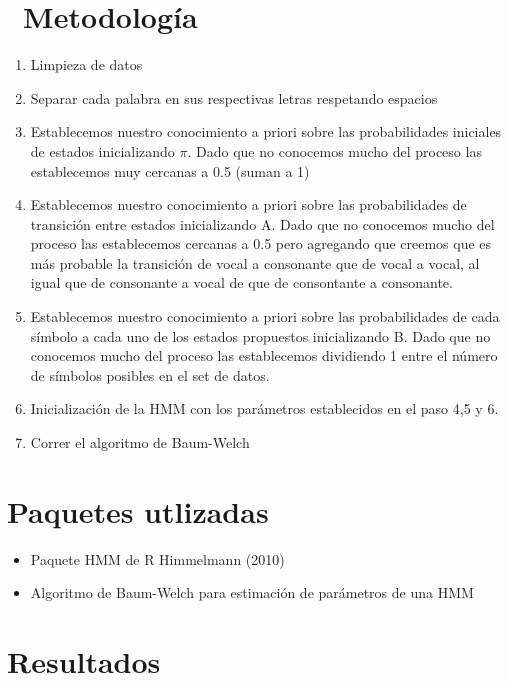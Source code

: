 \documentclass[]{article}
\begin{document}
\section{~Metodología}\label{metodologia}

\begin{enumerate}
\def\labelenumi{\arabic{enumi}.}
\itemsep1pt\parskip0pt
\item
  Limpieza de datos
\item
  Separar cada palabra en sus respectivas letras respetando espacios
\item
  Establecemos nuestro conocimiento a priori sobre las probabilidades
  iniciales de estados inicializando \(\pi\). Dado que no conocemos
  mucho del proceso las establecemos muy cercanas a 0.5 (suman a 1)
\item
  Establecemos nuestro conocimiento a priori sobre las probabilidades de
  transición entre estados inicializando A. Dado que no conocemos mucho
  del proceso las establecemos cercanas a 0.5 pero agregando que creemos
  que es más probable la transición de vocal a consonante que de vocal a
  vocal, al igual que de consonante a vocal de que de consontante a
  consonante.
\item
  Establecemos nuestro conocimiento a priori sobre las probabilidades de
  cada símbolo a cada uno de los estados propuestos inicializando B.
  Dado que no conocemos mucho del proceso las establecemos dividiendo 1
  entre el número de símbolos posibles en el set de datos.
\item
  Inicialización de la HMM con los parámetros establecidos en el paso
  4,5 y 6.
\item
  Correr el algoritmo de Baum-Welch
\end{enumerate}

\section{Paquetes utlizadas}\label{paquetes-utlizadas}

\begin{itemize}
\item
  Paquete HMM de R Himmelmann (2010)
\item
  Algoritmo de Baum-Welch para estimación de parámetros de una HMM
\end{itemize}

\section{Resultados}\label{resultados}
\end{document}
